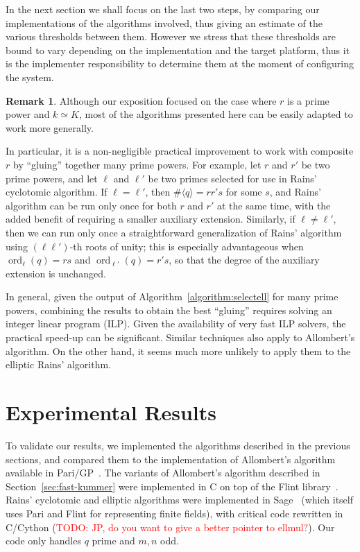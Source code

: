 \documentclass[12pt]{article}
\theoremstyle{plain}
\theoremstyle{definition}
\newtheorem*{remark}{Remark}
\newcommand{\todo}[1]{\textcolor{red}{TODO: #1}}
\DeclareMathOperator{\order}{ord} %
\newcounter{algorithm}
\begin{document}
In the next section we shall focus on the last two steps, by comparing
our implementations of the
algorithms involved, thus giving an estimate of the various thresholds
between them.  However we stress that these thresholds are bound to
vary depending on the implementation and the target platform, thus it
is the implementer responsibility to determine them at the moment of
configuring the system.

\begin{remark}
  Although our exposition focused on the case where $r$ is a prime
  power and $k\simeq K$, most of the algorithms presented here can be
  easily adapted to work more generally.

  In particular, it is a non-negligible practical improvement to work
  with composite $r$ by ``gluing'' together many prime powers. For
  example, let $r$ and $r'$ be two prime powers, and let $\ell$ and
  $\ell'$ be two primes selected for use in Rains' cyclotomic
  algorithm. If $\ell=\ell'$, then $\#\langle q\rangle=rr's$ for some
  $s$, and Rains' algorithm can be run only once for both $r$ and $r'$
  at the same time, with the added benefit of requiring a smaller
  auxiliary extension. Similarly, if $\ell\ne\ell'$, then we can run
  only once a straightforward generalization of Rains' algorithm using
  $(\ell\ell')$-th roots of unity; this is especially advantageous
  when $\order_\ell(q) = rs$ and $\order_{\ell'}(q) = r's$, so that
  the degree of the auxiliary extension is unchanged.

  In general, given the output of Algorithm~\ref{algorithm:selectell} for
  many prime powers, combining the results to obtain the best
  ``gluing'' requires solving an integer linear program (ILP). Given
  the availability of very fast ILP solvers, the practical speed-up
  can be significant.  Similar techniques also apply to Allombert's
  algorithm. On the other hand, it seems much more unlikely to apply
  them to the elliptic Rains' algorithm.
\end{remark}



\section{Experimental Results}

To validate our results, we implemented the algorithms described in
the previous sections, and compared them to the implementation of
Allombert's algorithm available in Pari/GP~\cite{Pari}. The variants
of Allombert's algorithm described in Section~\ref{sec:fast-kummer}
were implemented in C on top of the Flint
library~\cite{hart2010flint}. Rains' cyclotomic and elliptic
algorithms were implemented in Sage~\cite{Sage} (which itself uses
Pari and Flint for representing finite fields), with critical code
rewritten in C/Cython (\todo{JP, do you want to give a better pointer
  to ellmul?}). Our code only handles $q$ prime and $m,n$ odd.
\end{document}
